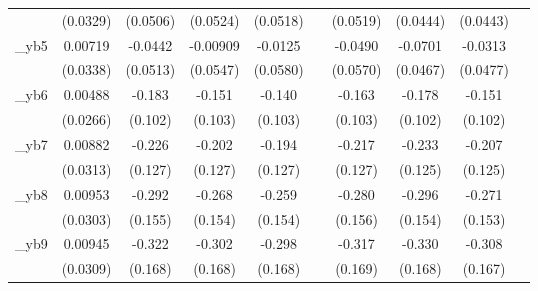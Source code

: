 \begin{table}[htbp]
\begin{tabular}{l*{9}{c}}
            &    (0.0329)         &    (0.0506)         &    (0.0524)         &    (0.0518)         &                     &    (0.0519)         &    (0.0444)         &    (0.0443)         &                     \\
[1em]
\_yb5        &     0.00719         &     -0.0442         &    -0.00909         &     -0.0125         &                     &     -0.0490         &     -0.0701         &     -0.0313         &                     \\
            &    (0.0338)         &    (0.0513)         &    (0.0547)         &    (0.0580)         &                     &    (0.0570)         &    (0.0467)         &    (0.0477)         &                     \\
[1em]
\_yb6        &     0.00488         &      -0.183\sym{*}  &      -0.151         &      -0.140         &                     &      -0.163         &      -0.178\sym{*}  &      -0.151         &                     \\
            &    (0.0266)         &     (0.102)         &     (0.103)         &     (0.103)         &                     &     (0.103)         &     (0.102)         &     (0.102)         &                     \\
[1em]
\_yb7        &     0.00882         &      -0.226\sym{*}  &      -0.202         &      -0.194         &                     &      -0.217\sym{*}  &      -0.233\sym{*}  &      -0.207\sym{*}  &                     \\
            &    (0.0313)         &     (0.127)         &     (0.127)         &     (0.127)         &                     &     (0.127)         &     (0.125)         &     (0.125)         &                     \\
[1em]
\_yb8        &     0.00953         &      -0.292\sym{*}  &      -0.268\sym{*}  &      -0.259\sym{*}  &                     &      -0.280\sym{*}  &      -0.296\sym{*}  &      -0.271\sym{*}  &                     \\
            &    (0.0303)         &     (0.155)         &     (0.154)         &     (0.154)         &                     &     (0.156)         &     (0.154)         &     (0.153)         &                     \\
[1em]
\_yb9        &     0.00945         &      -0.322\sym{*}  &      -0.302\sym{*}  &      -0.298\sym{*}  &                     &      -0.317\sym{*}  &      -0.330\sym{**} &      -0.308\sym{*}  &                     \\
            &    (0.0309)         &     (0.168)         &     (0.168)         &     (0.168)         &                     &     (0.169)         &     (0.168)         &     (0.167)         &                     \\

\end{tabular}
\end{table}
